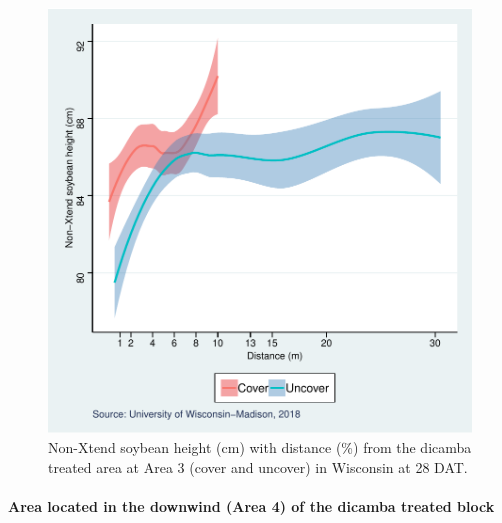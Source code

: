\documentclass[]{article}
\let\oldparagraph\paragraph
\renewcommand{\paragraph}[1]{\oldparagraph{#1}\mbox{}}
\begin{document}
\begin{figure}
\centering
\includegraphics{Report_files/figure-latex/unnamed-chunk-110-1.pdf}
\caption{Non-Xtend soybean height (cm) with distance (\%) from the
dicamba treated area at Area 3 (cover and uncover) in Wisconsin at 28
DAT.}
\end{figure}

\pagebreak
\newpage

\paragraph{Area located in the downwind (Area 4) of the dicamba treated
block}\label{area-located-in-the-downwind-area-4-of-the-dicamba-treated-block-1}
\end{document}
